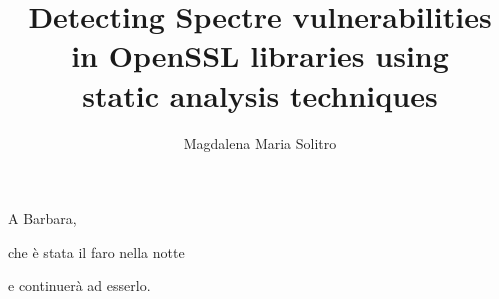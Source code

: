 \documentclass[target=mst,aauheader=aics]{thud}
\title{Detecting Spectre vulnerabilities \\in OpenSSL libraries using\\ static analysis techniques}
\author{Magdalena Maria Solitro}
\theoremstyle{definition}
\begin{document}
\maketitle

\begin{dedication}
	A Barbara,\par che è stata il faro nella notte \par e continuerà ad esserlo.
\end{dedication}

\begin{comment}

\acknowledgements
This thesis is not simply the result of my personal efforts, but is an achievement that benefited the support of many people around me. First and foremost, I would like to thank my parents, Ariella and Ugo, who always put my education in first place and made everything that was in their power to make me reach my goals. They should receive a special award for all the times they tolerated my temperament, which is certainly not the easiest one to deal with, but I hope that this achievement can at least partly pay them back for all the sacrifices they did for me. I am endlessly thankful to Alessandro Marchioro as well, who not only helped me with the many technical issues that I encountered during this work, but also gave me his unconditional love and emotional support in challenging times. I feel very grateful to have him in my life, and I hope he will stay by my side for a long time. I also had the luck of being surrounded by amazing friends: Claudia Ruggieri, whose fierce determination and intelligence inspire me every day, my course mates Renato Acampora and Alessio Fiorin, who are my adventure companions and were always ready to help me in whatever situation life put me in front of, Gurjeet Singh Sangra, who is one of the kindest and talented people I had the good fortune to cross during my path (and who also deserves an exceptional mention for handling my hot head). I am also grateful to my Judo friends Martina Maccari, Erica Maccari, and Elena Lonardi, with whom I shared infinite trainings, competitions, and painful diets, and gifted me their priceless friendship. I would like to thank the ASD Sport Team Judo Udine, with a particular mention to Luigi Girardi: when I moved to Udine, he welcomed me
in his Dojo, making me feel part of the group since the first day. Training with his team was fundamental to preserve not only my physical health, but also my mental well-being, and will always be grateful for that.


\end{comment}
\end{document}
